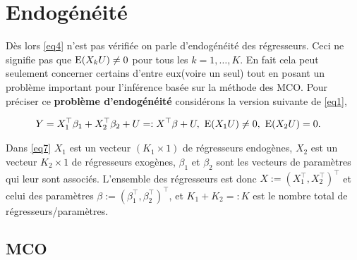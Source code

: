 \section{Endogénéité}

Dès lors \eqref{eq4} n'est pas vérifiée on parle d'endogénéité des régresseurs. Ceci ne signifie pas que 
 $\operatorname{E}(X_k U) \neq 0 $ pour tous les $k = 1, \ldots, K$. En fait cela peut seulement concerner certains d'entre 
 eux(voire un seul) tout en posant un problème important pour l'inférence basée sur la méthode des MCO. 
 Pour préciser ce \textbf{problème d'endogénéité} considérons la version suivante de 
 \eqref{eq1},

 \begin{align}
	Y &= X_1^\top\beta_1 + X_2^\top\beta_2 + U =: X^\top\beta + U, \ \Exp(X_1U) \neq 0, \ \Exp(X_2U) = 0.
	\label{eq7}
\end{align}

Dans \eqref{eq7} $X_1$ est un vecteur $(K_1\times 1)$ de régresseurs endogènes, $X_2$ est un vecteur $K_2\times 1$  
de régresseurs exogènes, $\beta_1$ et $\beta_2$ sont les vecteurs de paramètres qui leur sont associés. L'ensemble des régresseurs est 
 donc $X := (X_1^\top, X_2^\top) ^\top$ et celui des paramètres $\beta := (\beta_1^\top, \beta_2^\top) ^\top$, et 
 $K_1 + K_2 =: K$ est le nombre total de régresseurs/paramètres.

 \subsection{MCO}


